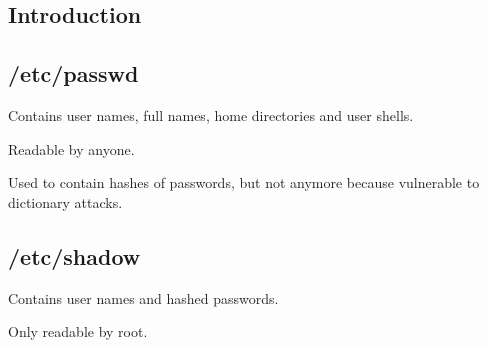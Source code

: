 
\subsection{Introduction}

\subsection{/etc/passwd}

Contains user names, full names, home directories and user shells.

Readable by anyone.

Used to contain hashes of passwords, but not anymore because vulnerable to dictionary attacks.

\subsection{/etc/shadow}

Contains user names and hashed passwords.

Only readable by root.

